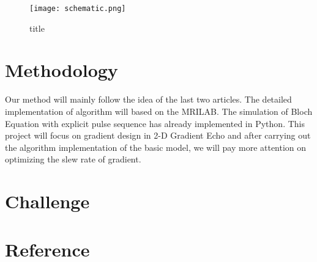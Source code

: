 \begin{figure}[ht]
    \centering
    \texttt{[image: schematic.png]}
    \caption{title}
    \label{schematic}
\end{figure}

\section{Methodology}

Our method will mainly follow the idea of the last two articles. The detailed implementation of algorithm will based on the MRILAB. The simulation of Bloch Equation with explicit pulse sequence has already implemented in Python. This project will focus on gradient design in 2-D Gradient Echo and after carrying out the algorithm implementation of the basic model, we will pay more attention on optimizing the slew rate of gradient.
\section{Challenge}

\section{Reference}
